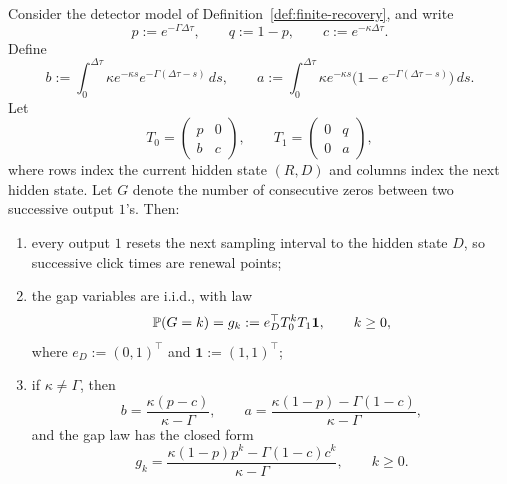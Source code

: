 \begin{theorem}\label{thm:finite-recovery-renewal}
Consider the detector model of Definition~\ref{def:finite-recovery}, and write
\[
p:=e^{-\Gamma\Delta\tau},
\qquad
q:=1-p,
\qquad
c:=e^{-\kappa\Delta\tau}.
\]
Define
\[
b:=\int_0^{\Delta\tau}\kappa e^{-\kappa s}e^{-\Gamma(\Delta\tau-s)}\,ds,
\qquad
a:=\int_0^{\Delta\tau}\kappa e^{-\kappa s}\bigl(1-e^{-\Gamma(\Delta\tau-s)}\bigr)\,ds.
\]
Let
\begin{equation}\label{eq:finite-recovery-T0T1}
T_0=
\begin{pmatrix}
p&0\\
b&c
\end{pmatrix},
\qquad
T_1=
\begin{pmatrix}
0&q\\
0&a
\end{pmatrix},
\end{equation}
where rows index the current hidden state $(R,D)$ and columns index the next hidden state. Let $G$ denote the number of consecutive zeros between two successive output $1$'s. Then:
\begin{enumerate}[label=(\roman*),leftmargin=*,itemsep=2pt]
  \item every output $1$ resets the next sampling interval to the hidden state $D$, so successive click times are renewal points;
  \item the gap variables are i.i.d., with law
  \begin{equation}\label{eq:finite-recovery-gap-law}
  \mathbb{P}(G=k)=g_k:=e_D^\top T_0^kT_1\mathbf 1,
  \qquad k\ge 0,
  \end{equation}
  where $e_D:=(0,1)^\top$ and $\mathbf 1:=(1,1)^\top$;
  \item if $\kappa\neq\Gamma$, then
  \begin{equation}\label{eq:finite-recovery-ab-closed}
  b=\frac{\kappa(p-c)}{\kappa-\Gamma},
  \qquad
  a=\frac{\kappa(1-p)-\Gamma(1-c)}{\kappa-\Gamma},
  \end{equation}
  and the gap law has the closed form
  \begin{equation}\label{eq:finite-recovery-gap-closed}
  g_k
  =
  \frac{\kappa(1-p)p^k-\Gamma(1-c)c^k}{\kappa-\Gamma},
  \qquad k\ge 0.
  \end{equation}
\end{enumerate}
\end{theorem}

